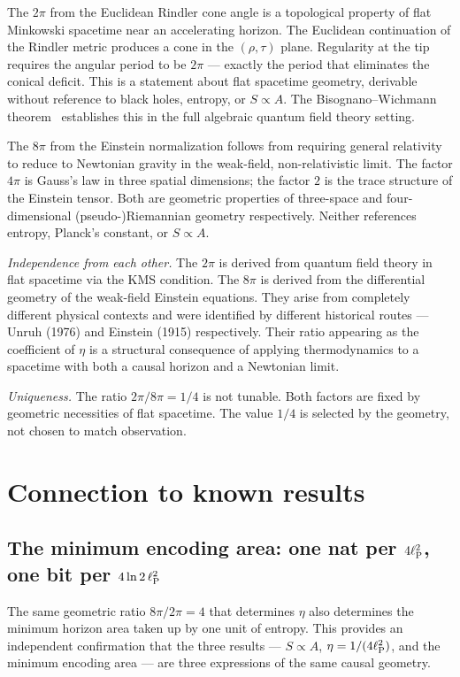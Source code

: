 The $2\pi$ from the Euclidean Rindler cone angle is a topological property of flat Minkowski spacetime near an accelerating horizon. The Euclidean
continuation of the Rindler metric produces a cone in the $(\rho,\tau)$ plane. Regularity at the tip requires the angular period to be $2\pi$ --- exactly the
period that eliminates the conical deficit. This is a statement about flat spacetime geometry, derivable without reference to black holes, entropy, or
$S\propto A$. The Bisognano--Wichmann theorem~\cite{BisognanoWichmann1976} establishes this in the full algebraic quantum field theory setting. \derived

The $8\pi$ from the Einstein normalization follows from requiring general relativity to reduce to Newtonian gravity in the weak-field, non-relativistic
limit. The factor $4\pi$ is Gauss's law in three spatial dimensions; the factor $2$ is the trace structure of the Einstein tensor. Both are geometric
properties of three-space and four-dimensional (pseudo-)Riemannian geometry respectively. Neither references entropy, Planck's constant, or $S\propto A$. \derived

\emph{Independence from each other.} The $2\pi$ is derived from quantum field theory in flat spacetime via the KMS condition. The $8\pi$ is derived from
the differential geometry of the weak-field Einstein equations. They arise from completely different physical contexts and were identified by different
historical routes --- Unruh (1976) and Einstein (1915) respectively. Their ratio appearing as the coefficient of $\eta$ is a structural consequence of
applying thermodynamics to a spacetime with both a causal horizon and a Newtonian limit. \interp

\emph{Uniqueness.} The ratio $2\pi/8\pi=1/4$ is not tunable. Both factors are fixed by geometric necessities of flat spacetime. The value $1/4$ is
selected by the geometry, not chosen to match observation. \interp

\section{Connection to known results}\label{sec:bk_known}
\subsection{The minimum encoding area: one nat per $4\ell_{\mathrm P}^2$, one bit per $4\ln2\,\ell_{\mathrm P}^2$}\label{sec:bk_minarea}
The same geometric ratio $8\pi/2\pi=4$ that determines $\eta$ also determines the minimum horizon area taken up by one unit of entropy. This provides an
independent confirmation that the three results --- $S\propto A$, $\eta=1/(4\ell_{\mathrm P}^2)$, and the minimum encoding area --- are three expressions of the same
causal geometry. \interp

